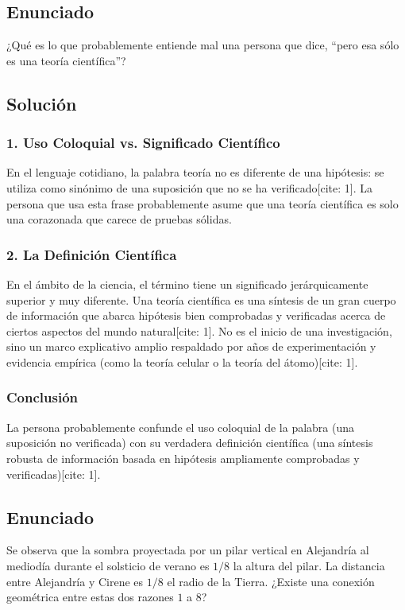 \documentclass[12pt, a4paper]{article}
\begin{document}
\newpage

\subsection*{Enunciado}
¿Qué es lo que probablemente entiende mal una persona que dice, ``pero esa sólo es una teoría científica''?

\subsection*{Solución}

\subsubsection*{1. Uso Coloquial vs. Significado Científico}
En el lenguaje cotidiano, la palabra teoría no es diferente de una hipótesis: se utiliza como sinónimo de una suposición que no se ha verificado[cite: 1]. La persona que usa esta frase probablemente asume que una teoría científica es solo una corazonada que carece de pruebas sólidas.

\subsubsection*{2. La Definición Científica}
En el ámbito de la ciencia, el término tiene un significado jerárquicamente superior y muy diferente. Una teoría científica es una síntesis de un gran cuerpo de información que abarca hipótesis bien comprobadas y verificadas acerca de ciertos aspectos del mundo natural[cite: 1]. No es el inicio de una investigación, sino un marco explicativo amplio respaldado por años de experimentación y evidencia empírica (como la teoría celular o la teoría del átomo)[cite: 1].

\subsubsection*{Conclusión}
La persona probablemente confunde el uso coloquial de la palabra (una suposición no verificada) con su verdadera definición científica (una síntesis robusta de información basada en hipótesis ampliamente comprobadas y verificadas)[cite: 1].

\newpage

\subsection*{Enunciado}
Se observa que la sombra proyectada por un pilar vertical en Alejandría al mediodía durante el solsticio de verano es $1/8$ la altura del pilar. La distancia entre Alejandría y Cirene es $1/8$ el radio de la Tierra. ¿Existe una conexión geométrica entre estas dos razones $1$ a $8$?
\end{document}
